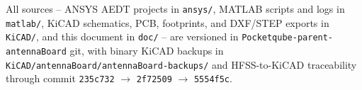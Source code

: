 All sources -- ANSYS AEDT projects in \texttt{ansys/}, MATLAB scripts and logs in \texttt{matlab/}, KiCAD schematics, PCB, footprints, and DXF/STEP exports in \texttt{KiCAD/}, and this document in \texttt{doc/} -- are versioned in \texttt{Pocketqube-parent-antennaBoard} git, with binary KiCAD backups in \texttt{KiCAD/antennaBoard/antennaBoard-backups/} and HFSS-to-KiCAD traceability through commit \texttt{235c732} $\rightarrow$ \texttt{2f72509} $\rightarrow$ \texttt{5554f5c}.

